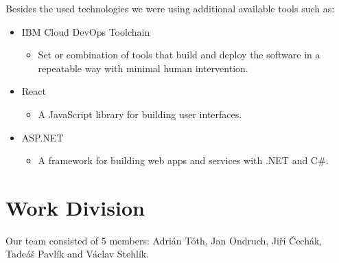 \documentclass[11pt,a4paper]{article}
\begin{document}
Besides the used technologies we were using additional available tools such as:
\begin{itemize}
    \item IBM Cloud DevOps Toolchain
    \begin{itemize}
        \item Set or combination of tools that build and deploy the software in a repeatable way with minimal human intervention.
    \end{itemize}

    \item React
    \begin{itemize}
        \item A JavaScript library for building user interfaces.
    \end{itemize}

    \item ASP.NET
    \begin{itemize}
        \item A framework for building web apps and services with .NET and C\#.
    \end{itemize}
\end{itemize}

\section{Work Division}

Our team consisted of 5 members: Adrián Tóth, Jan Ondruch, Jiří Čechák, Tadeáš Pavlík and Václav Stehlík.\\
\end{document}
